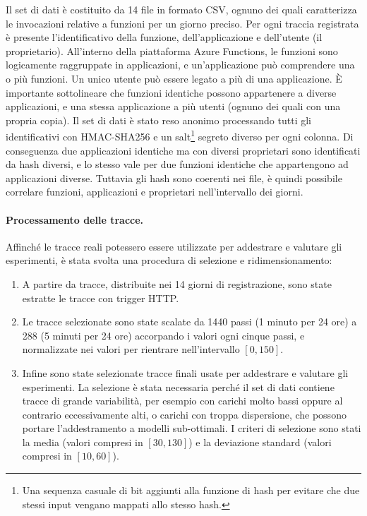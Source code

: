 Il set di dati è costituito da 14 file in formato CSV, ognuno dei quali caratterizza le invocazioni relative a funzioni per un giorno preciso. Per ogni traccia registrata è presente l'identificativo della funzione, dell'applicazione e dell'utente (il proprietario). All'interno della piattaforma Azure Functions, le funzioni sono logicamente raggruppate in applicazioni, e un'applicazione può comprendere una o più funzioni. Un unico utente può essere legato a più di una applicazione. È importante sottolineare che funzioni identiche possono appartenere a diverse applicazioni, e una stessa applicazione a più utenti (ognuno dei quali con una propria copia). Il set di dati è stato reso anonimo processando tutti gli identificativi con HMAC-SHA256 e un salt\footnote{Una sequenza casuale di bit aggiunti alla funzione di hash per evitare che due stessi input vengano mappati allo stesso hash.} segreto diverso per ogni colonna. Di conseguenza due applicazioni identiche ma con diversi proprietari sono identificati da hash diversi, e lo stesso vale per due funzioni identiche che appartengono ad applicazioni diverse. Tuttavia gli hash sono coerenti nei file, è quindi possibile correlare funzioni, applicazioni e proprietari nell'intervallo dei giorni.

\paragraph{Processamento delle tracce.} Affinché le tracce reali potessero essere utilizzate per addestrare e valutare gli esperimenti, è stata svolta una procedura di selezione e ridimensionamento:

\begin{enumerate}
    \item A partire da  tracce, distribuite nei 14 giorni di registrazione, sono state estratte le  tracce con trigger HTTP.

    \item Le tracce selezionate sono state scalate da 1440 passi (1 minuto per 24 ore) a 288 (5 minuti per 24 ore) accorpando i valori ogni cinque passi, e normalizzate nei valori per rientrare nell'intervallo $[0, 150]$.
    
    \item Infine sono state selezionate  tracce finali usate per addestrare e valutare gli esperimenti. La selezione è stata necessaria perché il set di dati contiene tracce di grande variabilità, per esempio con carichi molto bassi oppure al contrario eccessivamente alti, o carichi con troppa dispersione, che possono portare l'addestramento a modelli sub-ottimali. I criteri di selezione sono stati la media (valori compresi in $[30, 130]$) e la deviazione standard (valori compresi in $[10, 60]$).
\end{enumerate}

